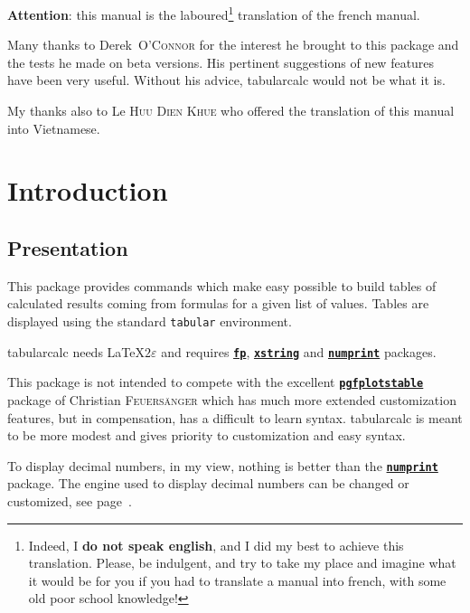 \documentclass[a4paper,10pt]{article}
\newcommand\tbcalc{\textsf{tabularcalc}\xspace}
\begin{document}
\tableofcontents
\bigskip

\textbf{Attention}: this manual is the laboured\footnote{Indeed, I \textbf{do not speak english}, and I did my best to achieve this translation. Please, be indulgent, and try to take my place and imagine what it would be for you if you had to translate a manual into french, with some old poor school knowledge!} translation of the french manual.\medskip

Many thanks to Derek~\textsc{O'Connor} for the interest he brought to this package and the tests he made on beta versions. His pertinent suggestions of new features have been very useful. Without his advice, \tbcalc would not be what it is.\medskip

My thanks also to Le \textsc{Huu Dien Khue} who offered the translation of this manual into Vietnamese.

\section{Introduction}
\subsection{Presentation}
This package provides commands which make easy possible to build tables of calculated results coming from formulas for a given list of values. Tables are displayed using the standard \verb|tabular| environment.

\tbcalc needs \LaTeX$2\varepsilon$ and requires \href{http://www.ctan.org/tex-archive/macros/latex/contrib/fp/}{\texttt{\textbf{fp}}}, \href{http://www.ctan.org/tex-archive/macros/latex/contrib/xstring/}{\texttt{\textbf{xstring}}} and \href{http://www.ctan.org/tex-archive/macros/latex/contrib/numprint/}{\texttt{\textbf{numprint}}} packages.\medskip

This package is not intended to compete with the excellent \href{http://www.ctan.org/tex-archive/graphics/pgf/contrib/pgfplots/}{\texttt{\textbf{pgfplotstable}}} package of Christian \textsc{Feuers\"anger} which has much more extended customization features, but in compensation, has a difficult to learn syntax. \tbcalc is meant to be more modest and gives priority to customization and easy syntax.\medskip


To display decimal numbers, in my view, nothing is better than the \href{http://www.ctan.org/tex-archive/macros/latex/contrib/numprint/}{\texttt{\textbf{numprint}}} package. The engine used to display decimal numbers can be changed or customized, see page~\pageref{persoaffichage}.\medskip
\end{document}
